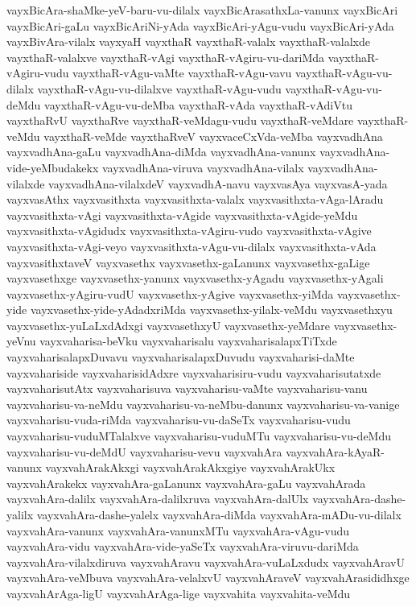 {vayxBicAra-shaMke-yeV-baru-vu-dilalx
vayxBicArasathxLa-vanunx
vayxBicAri
vayxBicAri-gaLu
vayxBicAriNi-yAda
vayxBicAri-yAgu-vudu
vayxBicAri-yAda
vayxBivAra-vilalx
vayxyaH
vayxthaR
vayxthaR-valalx
vayxthaR-valalxde
vayxthaR-valalxve
vayxthaR-vAgi
vayxthaR-vAgiru-vu-dariMda
vayxthaR-vAgiru-vudu
vayxthaR-vAgu-vaMte
vayxthaR-vAgu-vavu
vayxthaR-vAgu-vu-dilalx
vayxthaR-vAgu-vu-dilalxve
vayxthaR-vAgu-vudu
vayxthaR-vAgu-vu-deMdu
vayxthaR-vAgu-vu-deMba
vayxthaR-vAda
vayxthaR-vAdiVtu
vayxthaRvU
vayxthaRve
vayxthaR-veMdagu-vudu
vayxthaR-veMdare
vayxthaR-veMdu
vayxthaR-veMde
vayxthaRveV
vayxvaceCxVda-veMba
vayxvadhAna
vayxvadhAna-gaLu
vayxvadhAna-diMda
vayxvadhAna-vanunx
vayxvadhAna-vide-yeMbudakekx
vayxvadhAna-viruva
vayxvadhAna-vilalx
vayxvadhAna-vilalxde
vayxvadhAna-vilalxdeV
vayxvadhA-navu
vayxvasAya
vayxvasA-yada
vayxvasAthx
vayxvasithxta
vayxvasithxta-valalx
vayxvasithxta-vAga-lAradu
vayxvasithxta-vAgi
vayxvasithxta-vAgide
vayxvasithxta-vAgide-yeMdu
vayxvasithxta-vAgidudx
vayxvasithxta-vAgiru-vudo
vayxvasithxta-vAgive
vayxvasithxta-vAgi-veyo
vayxvasithxta-vAgu-vu-dilalx
vayxvasithxta-vAda
vayxvasithxtaveV
vayxvasethx
vayxvasethx-gaLanunx
vayxvasethx-gaLige
vayxvasethxge
vayxvasethx-yanunx
vayxvasethx-yAgadu
vayxvasethx-yAgali
vayxvasethx-yAgiru-vudU
vayxvasethx-yAgive
vayxvasethx-yiMda
vayxvasethx-yide
vayxvasethx-yide-yAdadxriMda
vayxvasethx-yilalx-veMdu
vayxvasethxyu
vayxvasethx-yuLaLxdAdxgi
vayxvasethxyU
vayxvasethx-yeMdare
vayxvasethx-yeVnu
vayxvaharisa-beVku
vayxvaharisalu
vayxvaharisalapxTiTxde
vayxvaharisalapxDuvavu
vayxvaharisalapxDuvudu
vayxvaharisi-daMte
vayxvahariside
vayxvaharisidAdxre
vayxvaharisiru-vudu
vayxvaharisutatxde
vayxvaharisutAtx
vayxvaharisuva
vayxvaharisu-vaMte
vayxvaharisu-vanu
vayxvaharisu-va-neMdu
vayxvaharisu-va-neMbu-danunx
vayxvaharisu-va-vanige
vayxvaharisu-vuda-riMda
vayxvaharisu-vu-daSeTx
vayxvaharisu-vudu
vayxvaharisu-vuduMTalalxve
vayxvaharisu-vuduMTu
vayxvaharisu-vu-deMdu
vayxvaharisu-vu-deMdU
vayxvaharisu-vevu
vayxvahAra
vayxvahAra-kAyaR-vanunx
vayxvahArakAkxgi
vayxvahArakAkxgiye
vayxvahArakUkx
vayxvahArakekx
vayxvahAra-gaLanunx
vayxvahAra-gaLu
vayxvahArada
vayxvahAra-dalilx
vayxvahAra-dalilxruva
vayxvahAra-dalUlx
vayxvahAra-dashe-yalilx
vayxvahAra-dashe-yalelx
vayxvahAra-diMda
vayxvahAra-mADu-vu-dilalx
vayxvahAra-vanunx
vayxvahAra-vanunxMTu
vayxvahAra-vAgu-vudu
vayxvahAra-vidu
vayxvahAra-vide-yaSeTx
vayxvahAra-viruvu-dariMda
vayxvahAra-vilalxdiruva
vayxvahAravu
vayxvahAra-vuLaLxdudx
vayxvahAravU
vayxvahAra-veMbuva
vayxvahAra-velalxvU
vayxvahAraveV
vayxvahArasididhxge
vayxvahArAga-ligU
vayxvahArAga-lige
vayxvahita
vayxvahita-veMdu
}

